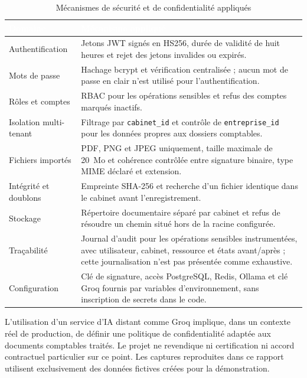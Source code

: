 \documentclass[12pt,a4paper,oneside]{report}
\newcommand{\TableSetup}{%
  \arrayrulecolor{ComptaTableLine}%
  \setlength{\arrayrulewidth}{0.45pt}%
  \renewcommand{\arraystretch}{1.18}%
}
\newcommand{\TableHead}[1]{\textcolor{white}{\textbf{#1}}}
\begin{document}
\begin{table}[H]
\centering
\caption{Mécanismes de sécurité et de confidentialité appliqués}
\footnotesize
\TableSetup
\begin{tabularx}{\textwidth}{|L{3.8cm}|Y|}
\toprule
{}\TableHead{Domaine} & \TableHead{Mécanisme appliqué} \\
\midrule
Authentification & Jetons JWT signés en HS256, durée de validité de huit heures et rejet des jetons invalides ou expirés. \\
Mots de passe & Hachage bcrypt et vérification centralisée ; aucun mot de passe en clair n'est utilisé pour l'authentification. \\
Rôles et comptes & RBAC pour les opérations sensibles et refus des comptes marqués inactifs. \\
Isolation multi-tenant & Filtrage par \texttt{cabinet\_id} et contrôle de \texttt{entreprise\_id} pour les données propres aux dossiers comptables. \\
Fichiers importés & PDF, PNG et JPEG uniquement, taille maximale de 20~Mo et cohérence contrôlée entre signature binaire, type MIME déclaré et extension. \\
Intégrité et doublons & Empreinte SHA-256 et recherche d'un fichier identique dans le cabinet avant l'enregistrement. \\
Stockage & Répertoire documentaire séparé par cabinet et refus de résoudre un chemin situé hors de la racine configurée. \\
Traçabilité & Journal d'audit pour les opérations sensibles instrumentées, avec utilisateur, cabinet, ressource et états avant/après ; cette journalisation n'est pas présentée comme exhaustive. \\
Configuration & Clé de signature, accès PostgreSQL, Redis, Ollama et clé Groq fournis par variables d'environnement, sans inscription de secrets dans le code. \\
\bottomrule
\end{tabularx}
\end{table}

L'utilisation d'un service d'IA distant comme Groq implique, dans un contexte
réel de production, de définir une politique de confidentialité adaptée aux
documents comptables traités. Le projet ne revendique ni certification ni
accord contractuel particulier sur ce point. Les captures reproduites dans ce
rapport utilisent exclusivement des données fictives créées pour la
démonstration.

\end{document}
